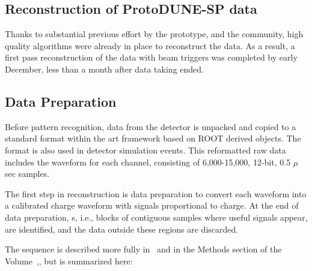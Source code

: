 \subsection{Reconstruction of ProtoDUNE-SP data}
Thanks to substantial previous effort by the  prototype,  and the   community, high quality algorithms were already in place to reconstruct the   data.  As a result, a first pass reconstruction of the  data with beam triggers was completed by early December, less than a month after data taking ended.



\subsection{Data Preparation}

Before pattern recognition, data from the  detector is
unpacked and copied to a standard format within the art framework based on ROOT  derived objects. 
The format is also used in detector simulation events.
This reformatted raw data includes the waveform for each channel, consisting of 6,000-15,000,  12-bit, 0.5 $\mu$sec samples. 

The first step in reconstruction is data preparation to
convert each  waveform into a calibrated charge waveform with
signals proportional to charge. At the end of data preparation, s, i.e., blocks of contiguous samples where
useful signals appear, are identified, and the data outside these regions are discarded.



The sequence is described more fully in~\cite{bib:docdb12349} and in the Methods section of the Volume~\volnumberphysics,\voltitlephysics{}, but is summarized here: 

